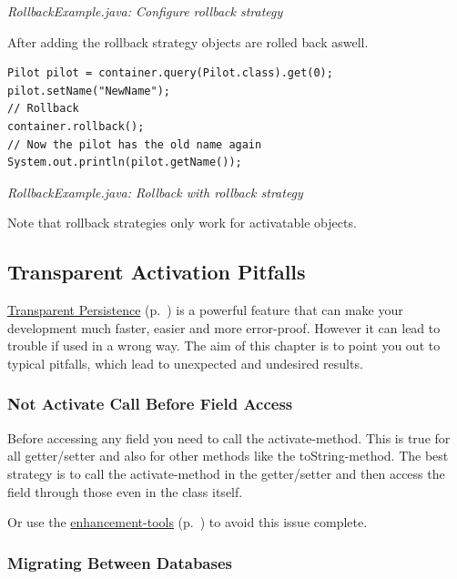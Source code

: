 {\small\itshape RollbackExample.java: Configure rollback strategy\par}
\medskip

After adding the rollback strategy objects are rolled back aswell.

\begin{lstlisting}
Pilot pilot = container.query(Pilot.class).get(0);
pilot.setName("NewName");
// Rollback
container.rollback();
// Now the pilot has the old name again
System.out.println(pilot.getName());
\end{lstlisting}

{\small\itshape RollbackExample.java: Rollback with rollback strategy\par}
\medskip

Note that rollback strategies only work for activatable objects.

\subsection{Transparent Activation Pitfalls}
\label{ref:basics-transparentpersistence-transparent-activation-pitfalls}

\hyperref[ref:basics-activation-concept-transparent-activation-framework]{Transparent Persistence} (p.~\pageref{ref:basics-activation-concept-transparent-activation-framework}) is a powerful feature that can make your development much faster, easier and more error-proof. However it can lead to trouble if used in a wrong way. The aim of this chapter is to point you out to typical pitfalls, which lead to unexpected and undesired results.

\subsubsection*{Not Activate Call Before Field Access}

Before accessing any field you need to call the activate-method. This is true for all getter/setter and also for other methods like the toString-method. The best strategy is to call the activate-method in the getter/setter and then access the field through those even in the class itself.

Or use the \hyperref[ref:advanced-topics-enhancement-tools]{enhancement-tools} (p.~\pageref{ref:advanced-topics-enhancement-tools}) to avoid this issue complete.

\subsubsection*{Migrating Between Databases}

